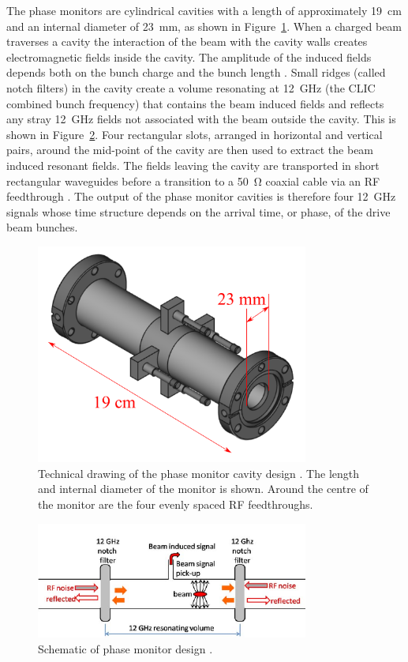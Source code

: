The phase monitors are cylindrical cavities with a length of approximately 19~cm and an internal diameter of 23~mm, as shown in Figure~\ref{f:phMonTechDraw}. When a charged beam traverses a cavity the interaction of the beam with the cavity walls creates electromagnetic fields inside the cavity. The amplitude of the induced fields depends both on the bunch charge and the bunch length \cite{alexPFFWP}. Small ridges (called notch filters) in the cavity create a volume resonating at 12~GHz (the CLIC combined bunch frequency) that contains the beam induced fields and reflects any stray 12~GHz fields not associated with the beam outside the cavity. This is shown in Figure~\ref{f:notchFilters}. Four rectangular slots, arranged in horizontal and vertical pairs, around the mid-point of the cavity are then used to extract the beam induced resonant fields. The fields leaving the cavity are transported in short rectangular waveguides before a transition to a 50~\(\mathrm{\Omega}\) coaxial cable via an RF feedthrough \cite{phMonIPAC10}. The output of the phase monitor cavities is therefore four 12~GHz signals whose time structure depends on the arrival time, or phase, of the drive beam bunches.

\begin{figure}
  \centering
  \includegraphics[width=0.8\textwidth]{Figures/phaseMons/phMonTechDraw}
  \caption{Technical drawing of the phase monitor cavity design \cite{phMonTechDraw}. The length and internal diameter of the monitor is shown. Around the centre of the monitor are the four evenly spaced RF feedthroughs.}
  \label{f:phMonTechDraw}
\end{figure}

\begin{figure}
  \centering
  \includegraphics[width=0.8\textwidth]{Figures/phaseMons/notchFilters}
  \caption{Schematic of phase monitor design \cite{phMonEuCard}.}
  \label{f:notchFilters}
\end{figure}


